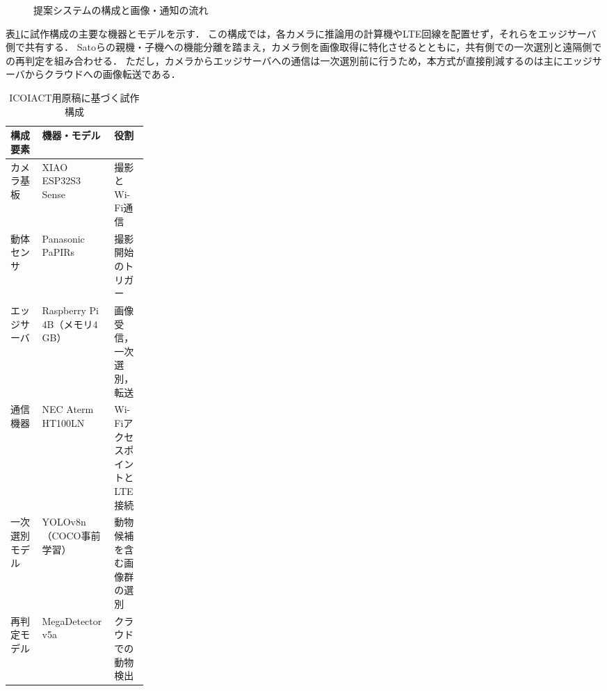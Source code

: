 \begin{figure}[tbp]
  \centering
  \caption{提案システムの構成と画像・通知の流れ}
  \label{fig:system-overview}
\end{figure}

表\ref{tab:system-components}に試作構成の主要な機器とモデルを示す．
この構成では，各カメラに推論用の計算機やLTE回線を配置せず，それらをエッジサーバ側で共有する．
Satoら\cite{Sato2022}の親機・子機への機能分離を踏まえ，カメラ側を画像取得に特化させるとともに，共有側での一次選別と遠隔側での再判定を組み合わせる．
ただし，カメラからエッジサーバへの通信は一次選別前に行うため，本方式が直接削減するのは主にエッジサーバからクラウドへの画像転送である．

\begin{table}[tbp]
  \centering
  \small
  \caption{ICOIACT用原稿に基づく試作構成}
  \label{tab:system-components}
  \begin{tabularx}{\linewidth}{p{0.23\linewidth}XX}
    \toprule
    構成要素 & 機器・モデル & 役割 \\
    \midrule
    カメラ基板 & XIAO ESP32S3 Sense & 撮影とWi-Fi通信 \\
    動体センサ & Panasonic PaPIRs & 撮影開始のトリガー \\
    エッジサーバ & Raspberry Pi 4B（メモリ4\,GB） & 画像受信，一次選別，転送 \\
    通信機器 & NEC Aterm HT100LN & Wi-FiアクセスポイントとLTE接続 \\
    一次選別モデル & YOLOv8n（COCO事前学習） & 動物候補を含む画像群の選別 \\
    再判定モデル & MegaDetector v5a & クラウドでの動物検出 \\
    \bottomrule
  \end{tabularx}
\end{table}

